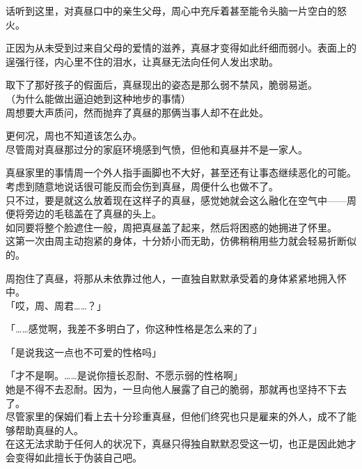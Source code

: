 话听到这里，对真昼口中的亲生父母，周心中充斥着甚至能令头脑一片空白的怒火。

正因为从未受到过来自父母的爱情的滋养，真昼才变得如此纤细而弱小。表面上的逞强行径，内心里不住的泪水，让真昼无法向任何人发出求助。\\

\vspace{2\baselineskip}

取下了那好孩子的假面后，真昼现出的姿态是那么弱不禁风，脆弱易逝。\\

（为什么能做出逼迫她到这种地步的事情）\\

周想要大声质问，然而抛弃了真昼的那俩当事人却不在此处。

更何况，周也不知道该怎么办。\\

尽管周对真昼那过分的家庭环境感到气愤，但他和真昼并不是一家人。

真昼家里的事情周一个外人指手画脚也不大好，甚至还有让事态继续恶化的可能。考虑到随意地说话很可能反而会伤到真昼，周便什么也做不了。\\

只不过，要是就这么放着现在这样子的真昼，感觉她就会这么融化在空气中——周便将旁边的毛毯盖在了真昼的头上。\\

如同要将整个脸遮住一般，周把真昼盖了起来，然后将困惑的她拥进了怀里。\\

这第一次由周主动抱紧的身体，十分娇小而无助，仿佛稍稍用些力就会轻易折断似的。

周抱住了真昼，将那从未依靠过他人，一直独自默默承受着的身体紧紧地拥入怀中。\\

「哎，周、周君……？」

「……感觉啊，我差不多明白了，你这种性格是怎么来的了」

「是说我这一点也不可爱的性格吗」

「才不是啊。……是说你擅长忍耐、不愿示弱的性格啊」\\

她是不得不去忍耐。因为，一旦向他人展露了自己的脆弱，那就再也坚持不下去了。\\

尽管家里的保姆们看上去十分珍重真昼，但他们终究也只是雇来的外人，成不了能够帮助真昼的人。\\

在这无法求助于任何人的状况下，真昼只得独自默默忍受这一切，也正是因此她才会变得如此擅长于伪装自己吧。\\

